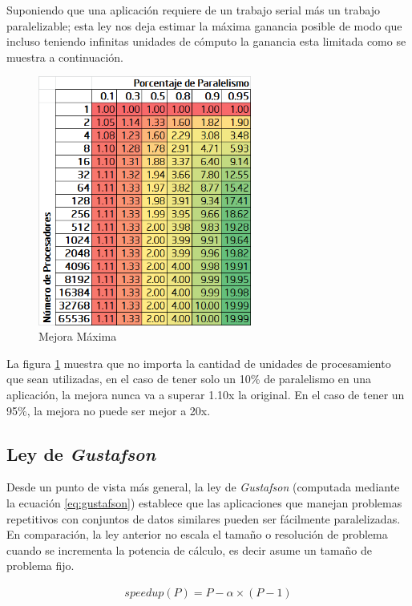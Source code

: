 \documentclass[a4paper]{report}
\begin{document}
\bigskip

Suponiendo que una aplicación requiere de un trabajo serial más un trabajo paralelizable; esta ley nos deja estimar la máxima ganancia posible
de modo que incluso teniendo infinitas unidades de cómputo la ganancia esta limitada como se muestra a continuación.

\begin{figure}[H]
\begin{center}
\includegraphics[width=7cm]{amdahl.png}
\caption{Mejora Máxima}
\label{fig:amdahl}
\end{center}
\end{figure}

La figura \ref{fig:amdahl} muestra que no importa la cantidad de unidades de
procesamiento que sean utilizadas, en el caso de tener solo un 10\% de paralelismo
en una aplicación, la mejora nunca va a superar 1.10x la original.
En el caso de tener un 95\%, la mejora no puede ser mejor a 20x.

\subsection{Ley de {\it Gustafson}}

Desde un punto de vista más general, la ley de {\it Gustafson}
\cite{gustafson} (computada mediante la ecuación \ref{eq:gustafson})
establece que las aplicaciones que manejan problemas
repetitivos con conjuntos de datos similares pueden ser fácilmente
paralelizadas. En comparación, la ley anterior no escala el tamaño o
resolución de problema cuando se incrementa la potencia de cálculo, es
decir asume un tamaño de problema fijo. 

\begin{eqnarray}
\label{eq:gustafson}
speedup(P) = P - \alpha \times ( P - 1)
\end{eqnarray}
\end{document}
